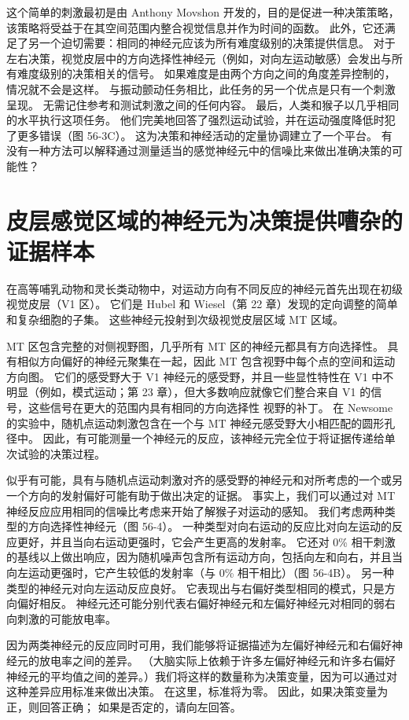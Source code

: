 这个简单的刺激最初是由 Anthony Movshon 开发的，目的是促进一种决策策略，该策略将受益于在其空间范围内整合视觉信息并作为时间的函数。 此外，它还满足了另一个迫切需要：相同的神经元应该为所有难度级别的决策提供信息。 对于左右决策，视觉皮层中的方向选择性神经元（例如，对向左运动敏感）会发出与所有难度级别的决策相关的信号。 如果难度是由两个方向之间的角度差异控制的，情况就不会是这样。 与振动颤动任务相比，此任务的另一个优点是只有一个刺激呈现。 无需记住参考和测试刺激之间的任何内容。 最后，人类和猴子以几乎相同的水平执行这项任务。 他们完美地回答了强烈运动试验，并在运动强度降低时犯了更多错误（图 56-3C）。 这为决策和神经活动的定量协调建立了一个平台。 有没有一种方法可以解释通过测量适当的感觉神经元中的信噪比来做出准确决策的可能性？

\section{皮层感觉区域的神经元为决策提供嘈杂的证据样本}

在高等哺乳动物和灵长类动物中，对运动方向有不同反应的神经元首先出现在初级视觉皮层（V1 区）。 它们是 Hubel 和 Wiesel（第 22 章）发现的定向调整的简单和复杂细胞的子集。 这些神经元投射到次级视觉皮层区域 MT 区域。

MT 区包含完整的对侧视野图，几乎所有 MT 区的神经元都具有方向选择性。 具有相似方向偏好的神经元聚集在一起，因此 MT 包含视野中每个点的空间和运动方向图。 它们的感受野大于 V1 神经元的感受野，并且一些显性特性在 V1 中不明显（例如，模式运动；第 23 章），但大多数响应就像它们整合来自 V1 的信号，这些信号在更大的范围内具有相同的方向选择性 视野的补丁。 在 Newsome 的实验中，随机点运动刺激包含在一个与 MT 神经元感受野大小相匹配的圆形孔径中。 因此，有可能测量一个神经元的反应，该神经元完全位于将证据传递给单次试验的决策过程。

似乎有可能，具有与随机点运动刺激对齐的感受野的神经元和对所考虑的一个或另一个方向的发射偏好可能有助于做出决定的证据。 事实上，我们可以通过对 MT 神经反应应用相同的信噪比考虑来开始了解猴子对运动的感知。 我们考虑两种类型的方向选择性神经元（图 56-4）。 一种类型对向右运动的反应比对向左运动的反应更好，并且当向右运动更强时，它会产生更高的发射率。 它还对 0\% 相干刺激的基线以上做出响应，因为随机噪声包含所有运动方向，包括向左和向右，并且当向左运动更强时，它产生较低的发射率（与 0\% 相干相比）（图 56-4B）。 另一种类型的神经元对向左运动反应良好。 它表现出与右偏好类型相同的模式，只是方向偏好相反。 神经元还可能分别代表右偏好神经元和左偏好神经元对相同的弱右向刺激的可能放电率。

因为两类神经元的反应同时可用，我们能够将证据描述为左偏好神经元和右偏好神经元的放电率之间的差异。 （大脑实际上依赖于许多左偏好神经元和许多右偏好神经元的平均值之间的差异。）我们将这样的数量称为决策变量，因为可以通过对这种差异应用标准来做出决策。 在这里，标准将为零。 因此，如果决策变量为正，则回答正确； 如果是否定的，请向左回答。

